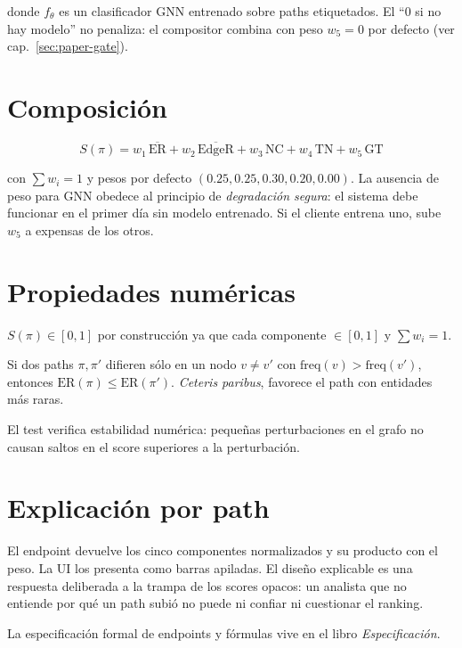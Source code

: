 donde $f_\theta$ es un clasificador GNN entrenado sobre paths
etiquetados. El ``0 si no hay modelo'' no penaliza: el
compositor combina con peso $w_5 = 0$ por defecto (ver
cap.~\ref{sec:paper-gate}).

\section{Composición}

\[
S(\pi) = w_1\,\overline{\text{ER}} + w_2\,\overline{\text{EdgeR}} + w_3\,\text{NC} + w_4\,\text{TN} + w_5\,\text{GT}
\]

con $\sum w_i = 1$ y pesos por defecto
$(0.25, 0.25, 0.30, 0.20, 0.00)$. La ausencia de peso para GNN
obedece al principio de \emph{degradación segura}: el sistema
debe funcionar en el primer día sin modelo entrenado. Si el
cliente entrena uno, sube $w_5$ a expensas de los otros.

\section{Propiedades numéricas}

\begin{invariant}
$S(\pi) \in [0, 1]$ por construcción ya que cada componente
$\in [0,1]$ y $\sum w_i = 1$.
\end{invariant}

\begin{invariant}
Si dos paths $\pi, \pi'$ difieren sólo en un nodo $v \ne v'$ con
$\text{freq}(v) > \text{freq}(v')$, entonces
$\text{ER}(\pi) \le \text{ER}(\pi')$. \emph{Ceteris paribus},
favorece el path con entidades más raras.
\end{invariant}

El test 
verifica estabilidad numérica: pequeñas perturbaciones en el
grafo no causan saltos en el score superiores a la perturbación.

\section{Explicación por path}

El endpoint  devuelve los cinco
componentes normalizados y su producto con el peso. La UI los
presenta como barras apiladas. El diseño explicable es una
respuesta deliberada a la trampa de los scores opacos: un analista
que no entiende por qué un path subió no puede ni confiar ni
cuestionar el ranking.

La especificación formal de endpoints y fórmulas vive en el libro
\emph{Especificación}.
